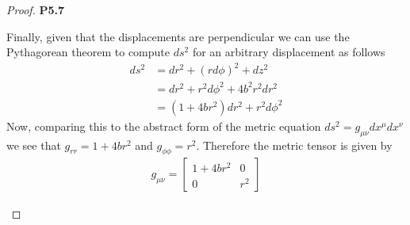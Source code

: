 \documentclass[11pt]{article}
\theoremstyle{definition}
\begin{document}
\begin{proof}{\textbf{P5.7}}
\begin{itemize}
    Finally, given that the displacements are perpendicular we can use
    the Pythagorean theorem to compute $ds^2$ for an arbitrary displacement
    as follows
    \begin{align*}
        ds^2 &= dr^2 + (rd\phi)^2 + dz^2\\
            &= dr^2 + r^2d\phi^2 + 4b^2r^2dr^2\\
            &= (1 + 4br^2) dr^2 + r^2d\phi^2
    \end{align*}
    Now, comparing this to the abstract form of the metric equation
    $ds^2 = g_{\mu\nu}dx^\mu dx^\nu$ we see that
    $g_{rr} = 1 + 4br^2$ and $g_{\phi\phi} = r^2$. Therefore the metric
    tensor is given by
    \begin{align*}
        g_{\mu\nu}
        = \begin{bmatrix}
            1 + 4br^2 & 0\\
            0 & r^2 
        \end{bmatrix}
    \end{align*}
    \end{itemize}
\end{proof}
\end{document}
